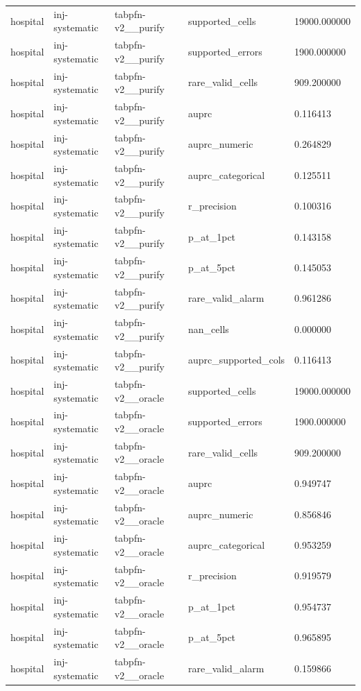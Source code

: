 \begin{tabular}{lllll}
hospital & inj-systematic & tabpfn-v2\_\_purify & supported\_cells & 19000.000000 \\
hospital & inj-systematic & tabpfn-v2\_\_purify & supported\_errors & 1900.000000 \\
hospital & inj-systematic & tabpfn-v2\_\_purify & rare\_valid\_cells & 909.200000 \\
hospital & inj-systematic & tabpfn-v2\_\_purify & auprc & 0.116413 \\
hospital & inj-systematic & tabpfn-v2\_\_purify & auprc\_numeric & 0.264829 \\
hospital & inj-systematic & tabpfn-v2\_\_purify & auprc\_categorical & 0.125511 \\
hospital & inj-systematic & tabpfn-v2\_\_purify & r\_precision & 0.100316 \\
hospital & inj-systematic & tabpfn-v2\_\_purify & p\_at\_1pct & 0.143158 \\
hospital & inj-systematic & tabpfn-v2\_\_purify & p\_at\_5pct & 0.145053 \\
hospital & inj-systematic & tabpfn-v2\_\_purify & rare\_valid\_alarm & 0.961286 \\
hospital & inj-systematic & tabpfn-v2\_\_purify & nan\_cells & 0.000000 \\
hospital & inj-systematic & tabpfn-v2\_\_purify & auprc\_supported\_cols & 0.116413 \\
hospital & inj-systematic & tabpfn-v2\_\_oracle & supported\_cells & 19000.000000 \\
hospital & inj-systematic & tabpfn-v2\_\_oracle & supported\_errors & 1900.000000 \\
hospital & inj-systematic & tabpfn-v2\_\_oracle & rare\_valid\_cells & 909.200000 \\
hospital & inj-systematic & tabpfn-v2\_\_oracle & auprc & 0.949747 \\
hospital & inj-systematic & tabpfn-v2\_\_oracle & auprc\_numeric & 0.856846 \\
hospital & inj-systematic & tabpfn-v2\_\_oracle & auprc\_categorical & 0.953259 \\
hospital & inj-systematic & tabpfn-v2\_\_oracle & r\_precision & 0.919579 \\
hospital & inj-systematic & tabpfn-v2\_\_oracle & p\_at\_1pct & 0.954737 \\
hospital & inj-systematic & tabpfn-v2\_\_oracle & p\_at\_5pct & 0.965895 \\
hospital & inj-systematic & tabpfn-v2\_\_oracle & rare\_valid\_alarm & 0.159866 \\

\end{tabular}
